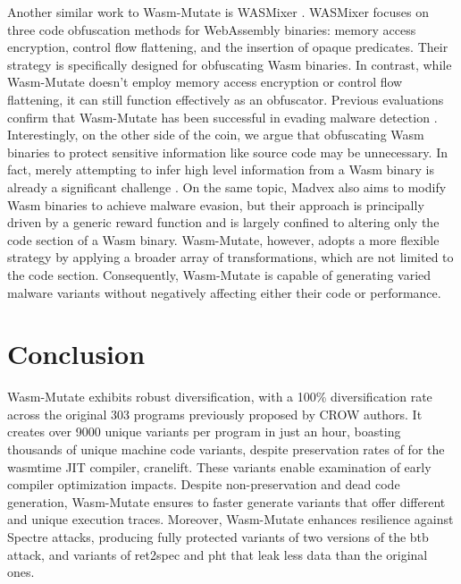 \documentclass[sigplan,screen]{acmart}
\newcommand{\tool}{{\sc Wasm-Mutate}\xspace}
\newcommand{\wasm}{Wasm\xspace}
\begin{document}
Another similar work to \tool is WASMixer \cite{wasmixer}.
WASMixer focuses on three code obfuscation methods for WebAssembly  binaries: memory access encryption, control flow flattening, and the insertion of opaque predicates. 
Their strategy is specifically designed for obfuscating Wasm binaries. 
In contrast, while \tool doesn't employ memory access encryption or control flow flattening, it can still function effectively as an obfuscator. 
Previous evaluations confirm that \tool has been successful in evading malware detection \cite{CABRERAARTEAGA2023103296}.
Interestingly, on the other side of the coin, we argue that obfuscating Wasm binaries to protect sensitive information like source code may be unnecessary. 
In fact, merely attempting to infer high level information from a \wasm binary is already a significant challenge \cite{10.1145/3597926.3598104}.
On the same topic, Madvex \cite{madvex} also aims to modify Wasm binaries to achieve malware evasion, but their approach is principally driven by a generic reward function and is largely confined to altering only the code section of a Wasm binary. 
\tool, however, adopts a more flexible strategy by applying a broader array of transformations, which are not limited to the code section. 
Consequently, \tool is capable of generating varied malware variants without negatively affecting either their code or performance.


\section{Conclusion}
\label{conc}

\tool exhibits robust diversification, with a 100\% diversification rate across the original 303 programs previously proposed by CROW authors. 
It creates over 9000 unique variants per program in just an hour, boasting thousands of unique machine code variants, despite preservation rates of \preserved for the wasmtime JIT compiler, cranelift. 
These variants enable examination of early compiler optimization impacts.
Despite non-preservation and dead code generation, \tool ensures to faster generate variants that offer different and unique execution traces. 
Moreover, \tool enhances resilience against Spectre attacks, producing fully protected variants of two versions of the btb attack, and variants of ret2spec and pht that leak less data than the original ones.
\end{document}
